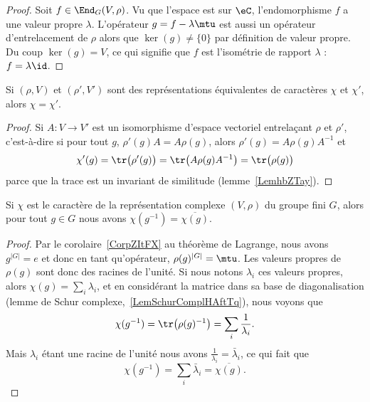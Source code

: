 \begin{proof}
	Soit \( f\in\End_{G}(V,\rho)\). Vu que l'espace est sur \( \eC\), l'endomorphisme \( f\) a une valeur propre \( \lambda\). L'opérateur \( g=f-\lambda\mtu\) est aussi un opérateur d'entrelacement de \( \rho\) alors que \( \ker(g)\neq \{ 0 \}\) par définition de valeur propre. Du coup \( \ker(g)=V\), ce qui signifie que \( f\) est l'isométrie de rapport \( \lambda\) : \( f=\lambda\id\).
\end{proof}

\begin{lemma}   \label{LempUSOlo}
	Si \( (\rho,V)\) et \( (\rho',V')\) sont des représentations équivalentes de caractères \( \chi\) et \( \chi'\), alors \( \chi=\chi'\).
\end{lemma}

\begin{proof}
	Si \( A\colon V\to V'\) est un isomorphisme d'espace vectoriel entrelaçant \( \rho\) et \( \rho'\), c'est-à-dire si pour tout \( g\), \( \rho'(g)A=A\rho(g)\), alors \( \rho'(g)=A\rho(g)A^{-1}\) et
	\begin{equation}
		\chi'(g)=\tr\big( \rho'(g) \big)=\tr\big( A\rho(g)A^{-1} \big)=\tr\big( \rho(g) \big)
	\end{equation}
	parce que la trace est un invariant de similitude (lemme~\ref{LemhbZTay}).
\end{proof}

\begin{lemma}   \label{LemJqIZns}
	Si \( \chi\) est le caractère de la représentation complexe \( (V,\rho)\) du groupe fini \( G\), alors pour tout \( g\in G\) nous avons \( \chi(g^{-1})=\overline{ \chi(g) }\).
\end{lemma}

\begin{proof}
	Par le corolaire~\ref{CorpZItFX} au théorème de Lagrange, nous avons \( g^{| G |}=e\) et donc en tant qu'opérateur, \( \rho(g)^{| G |}=\mtu\). Les valeurs propres de \( \rho(g)\) sont donc des racines de l'unité. Si nous notons \( \lambda_i\) ces valeurs propres, alors \( \chi(g)=\sum_i\lambda_i\), et en considérant la matrice dans sa base de diagonalisation (lemme de Schur complexe,~\ref{LemSchurComplHAftTq}), nous voyons que
	\begin{equation}
		\chi(g^{-1})=\tr\big( \rho(g)^{-1} \big)=\sum_i\frac{1}{ \lambda_i }.
	\end{equation}
	Mais \( \lambda_i\) étant une racine de l'unité nous avons \( \frac{1}{ \lambda_i }=\bar\lambda_i\), ce qui fait que
	\begin{equation}
		\chi(g^{-1})=\sum_i\bar\lambda_i=\overline{ \chi(g) }.
	\end{equation}
\end{proof}


